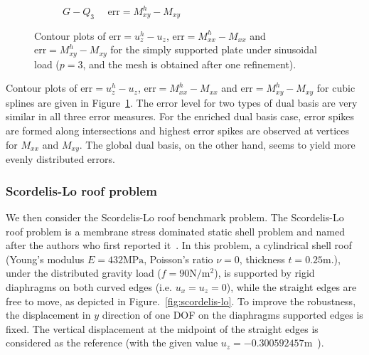 \begin{figure}[H]
\begin{subfigure}[t]{.45\linewidth}
		\caption{$G-Q_3$ $\quad \text{err} = M_{xy}^h-M_{xy}$}
	\end{subfigure}
	\caption{Contour plots of $\text{err} = u_z^h-u_z$, $\text{err} =  M_{xx}^h- M_{xx}$ and $\text{err} =  M_{xy}^h- M_{xy}$ for the simply supported plate under sinusoidal load ($p=3$, and the mesh is obtained after one refinement). }\label{fig:contour_d_mxx_mxy_plate}
\end{figure}

Contour plots of $\text{err} = u_z^h-u_z$, $\text{err} = M_{xx}^h-M_{xx}$ and $\text{err} = M_{xy}^h-M_{xy}$ for cubic splines are given in Figure~\ref{fig:contour_d_mxx_mxy_plate}. The error level for two types of dual basis are very similar in all three error measures. For the enriched \Bezier dual basis case, error spikes are formed along intersections and highest error spikes are observed at vertices for $M_{xx}$ and $M_{xy}$. The global dual basis, on the other hand, seems to yield more evenly distributed errors.

\FloatBarrier
\subsubsection{Scordelis-Lo roof problem}

We then consider the Scordelis-Lo roof benchmark problem. The Scordelis-Lo roof problem is a membrane stress dominated static shell problem and named after the authors who first reported it~\cite{scordelis1964computer}. In this problem, a cylindrical shell roof (Young's modulus $E=432\text{MPa}$, Poisson's ratio $\nu = 0$, thickness $t = 0.25\text{m}$.), under the distributed gravity load ($f = 90\text{N}/\text{m}^2$), is supported by rigid diaphragms on both curved edges (i.e. $u_{x}=u_z=0$), while the straight edges are free to move, as depicted in Figure.~\ref{fig:scordelis-lo}. To improve the robustness, the displacement in $y$ direction of one DOF on the diaphragms supported edges is fixed. The vertical displacement at the midpoint of the straight edges is considered as the reference (with the given value $u_z=-0.300592457\text{m}$~\cite{coox2017flexible}).\par

